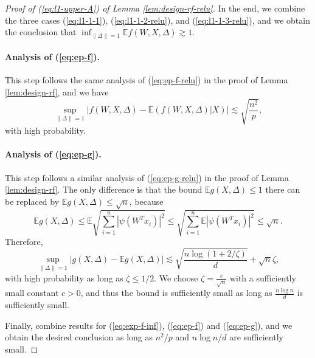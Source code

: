 \begin{proof}[Proof of (\ref{eq:l1-upper-A}) of Lemma \ref{lem:design-rf-relu}]
In the end, we combine the three cases (\ref{eq:l1-1-1}), (\ref{eq:l1-1-2-relu}), and (\ref{eq:l1-1-3-relu}),  and we obtain the conclusion that $\inf_{\|\Delta\|=1}\mathbb{E}f(W,X,\Delta)\gtrsim 1$.


\paragraph{Analysis of (\ref{eq:ep-f}).} This step follows the same analysis of (\ref{eq:ep-f-relu}) in the proof of Lemma \ref{lem:design-rf}, and we have
$$\sup_{\|\Delta\|=1}\left|f(W,X,\Delta)-\mathbb{E}(f(W,X,\Delta)|X)\right|\lesssim \sqrt{\frac{n^2}{p}},$$
with high probability.

\paragraph{Analysis of (\ref{eq:ep-g}).} This step follows a similar analysis of (\ref{eq:ep-g-relu}) in the proof of Lemma \ref{lem:design-rf}. The only difference is that the bound $\mathbb{E}g(X,\Delta)\leq 1$ there can be replaced by $\mathbb{E}g(X,\Delta)\leq \sqrt{n}$, because
$$\mathbb{E}g(X,\Delta)\leq \mathbb{E}\sqrt{\sum_{i=1}^n|\psi(W^Tx_i)|^2}\leq \sqrt{\sum_{i=1}^n\mathbb{E}|\psi(W^Tx_i)|^2}\leq \sqrt{n}.$$
Therefore,
$$\sup_{\|\Delta\|=1}|g(X,\Delta) - \mathbb{E}g(X,\Delta)|\lesssim \sqrt{\frac{n\log(1+2/\zeta)}{d}} + \sqrt{n}\zeta,$$
with high probability as long as $\zeta\leq 1/2$. We choose $\zeta=\frac{c}{\sqrt{n}}$ with a sufficiently small constant $c>0$, and thus the bound is sufficiently small as long as $\frac{n\log n}{d}$ is sufficiently small.

Finally, combine results for (\ref{eq:exp-f-inf}), (\ref{eq:ep-f}) and (\ref{eq:ep-g}), and we obtain the desired conclusion as long as $n^2/p$ and $n\log n/d$ are sufficiently small.
\end{proof}

